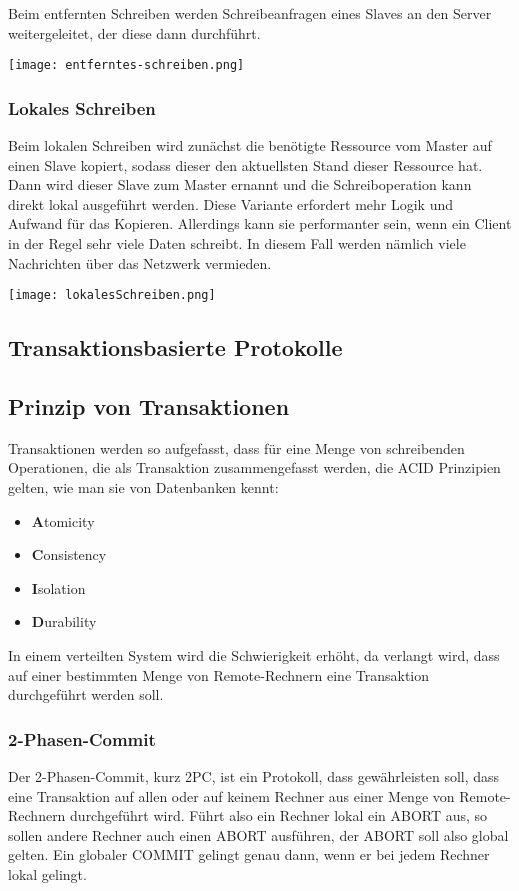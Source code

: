 Beim entfernten Schreiben werden Schreibeanfragen eines Slaves an den Server weitergeleitet, der diese dann durchführt.

\texttt{[image: entferntes-schreiben.png]}

\subsubsection{Lokales Schreiben}

Beim lokalen Schreiben wird zunächst die benötigte Ressource vom Master auf einen Slave kopiert, sodass dieser den aktuellsten Stand dieser Ressource hat. Dann wird dieser Slave zum Master ernannt und die Schreiboperation kann direkt lokal ausgeführt werden. Diese Variante erfordert mehr Logik und Aufwand für das Kopieren. Allerdings kann sie performanter sein, wenn ein Client in der Regel sehr viele Daten schreibt. In diesem Fall werden nämlich viele Nachrichten über das Netzwerk vermieden.

\texttt{[image: lokalesSchreiben.png]}


\subsection{Transaktionsbasierte Protokolle}

\subsection{Prinzip von Transaktionen}

Transaktionen werden so aufgefasst, dass für eine Menge von schreibenden Operationen, die als Transaktion zusammengefasst werden, die ACID Prinzipien gelten, wie man sie von Datenbanken kennt:
\begin{itemize}
      \item \textbf{A}tomicity
      \item \textbf{C}onsistency
      \item \textbf{I}solation
      \item \textbf{D}urability
\end{itemize}

In einem verteilten System wird die Schwierigkeit erhöht, da verlangt wird, dass auf einer bestimmten Menge von Remote-Rechnern eine Transaktion durchgeführt werden soll.

\subsubsection{2-Phasen-Commit}
\label{sec:2pc}
Der 2-Phasen-Commit, kurz 2PC, ist ein Protokoll, dass gewährleisten soll, dass eine Transaktion auf allen oder auf keinem Rechner aus einer Menge von Remote-Rechnern durchgeführt wird. Führt also ein Rechner lokal ein ABORT aus, so sollen andere Rechner auch einen ABORT ausführen, der ABORT soll also global gelten. Ein globaler COMMIT gelingt genau dann, wenn er bei jedem Rechner lokal gelingt.\\

